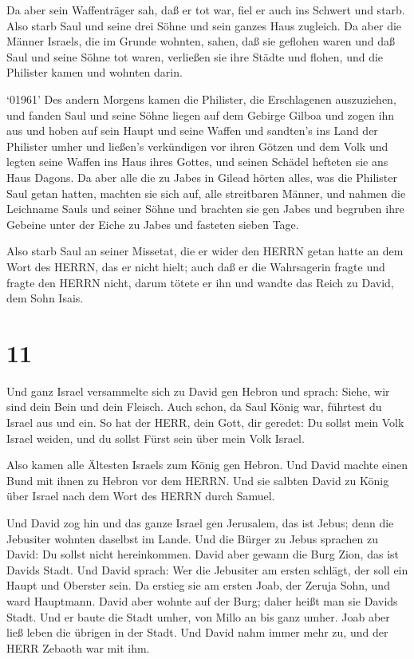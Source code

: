  Da aber sein Waffenträger sah, daß er tot war, fiel er auch
ins Schwert und starb.  Also starb Saul und seine drei Söhne
und sein ganzes Haus zugleich.  Da aber die Männer Israels,
die im Grunde wohnten, sahen, daß sie geflohen waren und daß Saul und
seine Söhne tot waren, verließen sie ihre Städte und flohen, und die
Philister kamen und wohnten darin.

 `01961' Des andern Morgens kamen die Philister, die
Erschlagenen auszuziehen, und fanden Saul und seine Söhne liegen auf dem
Gebirge Gilboa  und zogen ihn aus und hoben auf sein Haupt
und seine Waffen und sandten's ins Land der Philister umher und ließen's
verkündigen vor ihren Götzen und dem Volk  und legten seine
Waffen ins Haus ihres Gottes, und seinen Schädel hefteten sie ans Haus
Dagons.  Da aber alle die zu Jabes in Gilead hörten alles,
was die Philister Saul getan hatten,  machten sie sich auf,
alle streitbaren Männer, und nahmen die Leichname Sauls und seiner Söhne
und brachten sie gen Jabes und begruben ihre Gebeine unter der Eiche zu
Jabes und fasteten sieben Tage.

 Also starb Saul an seiner Missetat, die er wider den HERRN
getan hatte an dem Wort des HERRN, das er nicht hielt; auch daß er die
Wahrsagerin fragte  und fragte den HERRN nicht, darum
tötete er ihn und wandte das Reich zu David, dem Sohn Isais.

\hypertarget{section-10}{%
\section{11}\label{section-10}}

 Und ganz Israel versammelte sich zu David gen Hebron und
sprach: Siehe, wir sind dein Bein und dein Fleisch.  Auch
schon, da Saul König war, führtest du Israel aus und ein. So hat der
HERR, dein Gott, dir geredet: Du sollst mein Volk Israel weiden, und du
sollst Fürst sein über mein Volk Israel.

 Also kamen alle Ältesten Israels zum König gen Hebron. Und
David machte einen Bund mit ihnen zu Hebron vor dem HERRN. Und sie
salbten David zu König über Israel nach dem Wort des HERRN durch Samuel.

 Und David zog hin und das ganze Israel gen Jerusalem, das
ist Jebus; denn die Jebusiter wohnten daselbst im Lande. 
Und die Bürger zu Jebus sprachen zu David: Du sollst nicht hereinkommen.
David aber gewann die Burg Zion, das ist Davids Stadt.  Und
David sprach: Wer die Jebusiter am ersten schlägt, der soll ein Haupt
und Oberster sein. Da erstieg sie am ersten Joab, der Zeruja Sohn, und
ward Hauptmann.  David aber wohnte auf der Burg; daher heißt
man sie Davids Stadt.  Und er baute die Stadt umher, von
Millo an bis ganz umher. Joab aber ließ leben die übrigen in der Stadt.
 Und David nahm immer mehr zu, und der HERR Zebaoth war mit
ihm.

